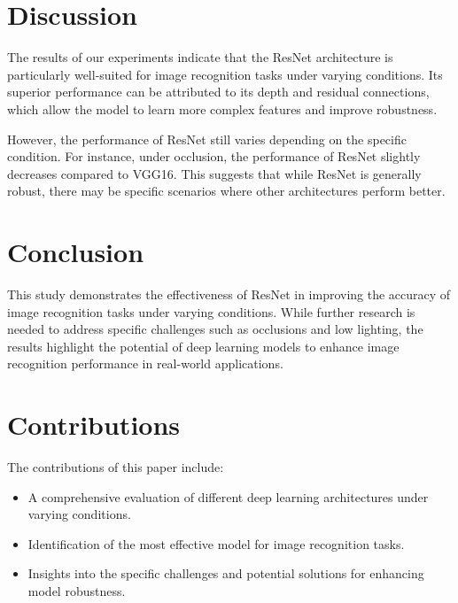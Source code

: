 \documentclass[12pt]{article}
\begin{document}
\section{Discussion}
The results of our experiments indicate that the ResNet architecture is particularly well-suited for image recognition tasks under varying conditions. Its superior performance can be attributed to its depth and residual connections, which allow the model to learn more complex features and improve robustness.

However, the performance of ResNet still varies depending on the specific condition. For instance, under occlusion, the performance of ResNet slightly decreases compared to VGG16. This suggests that while ResNet is generally robust, there may be specific scenarios where other architectures perform better.

\section{Conclusion}
This study demonstrates the effectiveness of ResNet in improving the accuracy of image recognition tasks under varying conditions. While further research is needed to address specific challenges such as occlusions and low lighting, the results highlight the potential of deep learning models to enhance image recognition performance in real-world applications.

\section{Contributions}
The contributions of this paper include:
\begin{itemize}
\item A comprehensive evaluation of different deep learning architectures under varying conditions.
\item Identification of the most effective model for image recognition tasks.
\item Insights into the specific challenges and potential solutions for enhancing model robustness.
\end{itemize}



\end{document}
